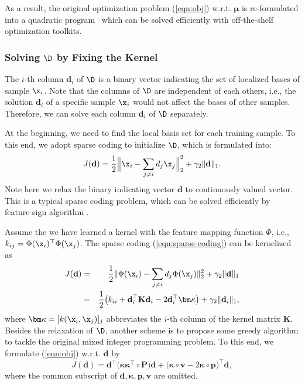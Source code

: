 As a result, the original optimization problem (\ref{eqn:obj}) w.r.t. $\bm\mu$ is re-formulated into a quadratic program~\cite{Boyd} which can be solved efficiently with off-the-shelf optimization toolkits.

\subsubsection{Solving $\D$ by Fixing the Kernel} %

The $i$-th column $\mathbf d_i$ of $\D$ is a binary vector indicating the set of localized bases of sample $\x_i$. Note that the columns of $\D$ are independent of each others, i.e., the solution $\mathbf d_i$ of a specific sample $\x_i$ would not affect the bases of other samples. Therefore, we can solve each column $\mathbf d_i$ of $\D$ separately.

At the beginning, we need to find the local basis set for each training sample. To this end, we adopt sparse coding to initialize $\D$, which is formulated into:
\begin{equation}
J(\mathbf d) = \frac{1}{2}\Big\| \x_i - \sum_{j\neq i}d_j\x_j \Big\|^2_2 + \gamma_2\| \mathbf d \|_1. \label{eqn:sparse-coding}
\end{equation}
Note here we relax the binary indicating vector $\mathbf d$ to continuously valued vector. This is a typical sparse coding problem, which can be solved efficiently by feature-sign algorithm \cite{nips/Lee06}.

Assume the we have learned a kernel with the feature mapping function $\Phi$, i.e., $k_{ij} = \Phi(\x_i)^\top\Phi(\x_j)$. The sparse coding (\ref{eqn:sparse-coding}) can be kernelized as
\begin{eqnarray}
J(\mathbf d) &=& \frac{1}{2}\| \Phi(\x_i) - \sum_{j\neq i}d_j\Phi(\x_j) \|_2^2+\gamma_2\| \mathbf d \|_1 \nonumber\\
&=& \frac{1}{2}\big(k_{ii} + \mathbf d_i^\top\mathbf K\mathbf d_i - 2\mathbf d_i^\top\bm\kappa\big) + \gamma_2\| \mathbf d_i \|_1 \nonumber,
\end{eqnarray}
where $\bm\kappa=[k(\x_i,\x_j)]_j$ abbreviates the $i$-th column of the kernel matrix $\mathbf K$. Besides the relaxation of $\D$, another scheme is to propose some greedy algorithm to tackle the original mixed integer programming problem. To this end, we formulate (\ref{eqn:obj}) w.r.t. $\mathbf d$ by
\begin{equation}
J(\mathbf d) = \mathbf d^\top\big(\bm\kappa\bm\kappa^\top\circ\mathbf P\big)\mathbf d + \big(\bm\kappa\circ\mathbf v- 2\bm\kappa\circ\mathbf p\big)^\top\mathbf d, \label{eqn:d}
\end{equation}
where the common subscript of $\mathbf d, \bm\kappa, \mathbf p, \mathbf v$ are omitted.

